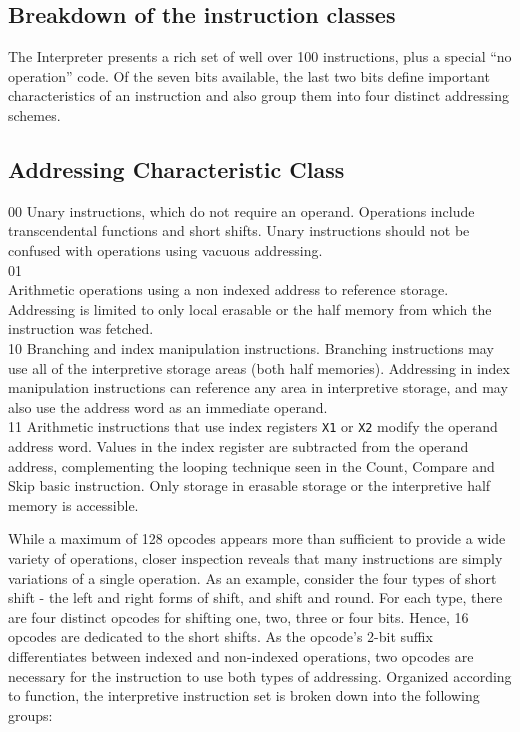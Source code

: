 \documentclass[refcap, oxford]{ahsan}
\begin{document}
\subsection{Breakdown of the instruction classes}
The Interpreter presents a rich set of well over 100 instructions, plus a special ``no operation'' code. Of the seven bits available, the last two bits define important characteristics of an instruction and also group them into four distinct addressing schemes.


\subsection{Addressing Characteristic Class}
00 Unary instructions, which do not require an operand. Operations include transcendental functions and short shifts. Unary instructions should not be confused with operations using vacuous addressing.\\
01\\
Arithmetic operations using a non indexed address to reference storage. Addressing is limited to only local erasable or the half memory from which the instruction was fetched.\\
10 Branching and index manipulation instructions. Branching instructions may use all of the interpretive storage areas (both half memories). Addressing in index manipulation instructions can reference any area in interpretive storage, and may also use the address word as an immediate operand.\\
11 Arithmetic instructions that use index registers \texttt{X1} or \texttt{X2} modify the operand address word. Values in the index register are subtracted from the operand address, complementing the looping technique seen in the Count, Compare and Skip basic instruction. Only storage in erasable storage or the interpretive half memory is accessible.

While a maximum of 128 opcodes appears more than sufficient to provide a wide variety of operations, closer inspection reveals that many instructions are simply variations of a single operation. As an example, consider the four types of short shift - the left and right forms of shift, and shift and round. For each type, there are four distinct opcodes for shifting one, two, three or four bits. Hence, 16 opcodes are dedicated to the short shifts. As the opcode's 2-bit suffix differentiates between indexed and non-indexed operations, two opcodes are necessary for the instruction to use both types of addressing. Organized according to function, the interpretive instruction set is broken down into the following groups:
\end{document}
